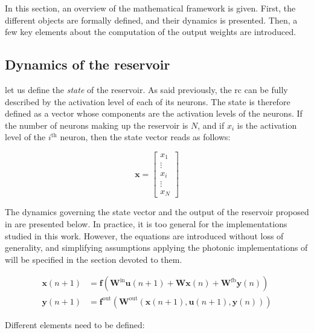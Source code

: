 In this section, an overview of the mathematical framework is given. First, the different objects are formally defined, and their dynamics is presented. Then, a few key elements about the computation of the output weights are introduced.


\subsection{Dynamics of the reservoir}

let us define the \textit{state} of the reservoir. As said previously, the \gls{rc} can be fully described by the activation level of each of its neurons. The state is therefore defined as a vector whose components are the activation levels of the neurons. If the number of neurons making up the reservoir is $N$, and if $x_i$ is the activation level of the $i^{\text{th}}$ neuron, then the state vector reads as follows:

\begin{equation}
	\mathbf{x} = \begin{bmatrix}
		x_1\\
		\vdots \\
		x_i \\
		\vdots \\
		x_N
	\end{bmatrix}
\end{equation}

The dynamics governing the state vector and the output of the reservoir proposed in \cite{JaegerH.2001Tesa} are presented below. In practice, it is too general for the implementations studied in this work. However, the equations are introduced without loss of generality, and simplifying assumptions applying the photonic implementations of \rcer will be specified in the section devoted to them.

\begin{align}
	\mathbf{x}(n+1) &= \mathbf{f} \left( \mathbf{W}^{\text{in}} \mathbf{u}(n+1) + \mathbf{W} \mathbf{x}(n) + \mathbf{W}^{\text{fb}} \mathbf{y}(n) \right) \label{rc_dynamics}\\
	\mathbf{y}(n+1) &= \mathbf{f}^{\text{out}} \left( \mathbf{W}^{\text{out}} \left(\mathbf{x}(n+1), \mathbf{u}(n+1), \mathbf{y}(n)\right) \right) \label{rc_output}
\end{align}

Different elements need to be defined: 

